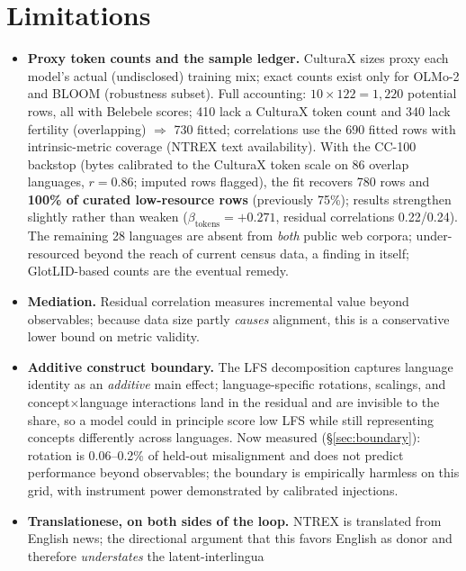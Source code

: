 \documentclass[11pt,a4paper]{article}
\begin{document}
\section{Limitations}
\begin{itemize}
  \item \textbf{Proxy token counts and the sample ledger.} CulturaX sizes
  proxy each model's actual (undisclosed) training mix; exact counts exist
  only for OLMo-2 and BLOOM (robustness subset). Full accounting: $10 \times
  122 = 1{,}220$ potential rows, all with Belebele scores; 410 lack a CulturaX
  token count and 340 lack fertility (overlapping) $\Rightarrow$ 730 fitted;
  correlations use the 690 fitted rows with intrinsic-metric coverage
  (NTREX text availability). With the CC-100 backstop (bytes calibrated to
  the CulturaX token scale on 86 overlap languages, $r{=}0.86$; imputed rows
  flagged), the fit recovers 780 rows and \textbf{100\% of curated
  low-resource rows} (previously 75\%); results strengthen slightly rather
  than weaken ($\beta_{\mathrm{tokens}} = +0.271$, residual correlations
  0.22/0.24). The remaining 28 languages are absent from \emph{both} public
  web corpora; under-resourced beyond the reach of current census data, a
  finding in itself; GlotLID-based counts are the eventual remedy.
  \item \textbf{Mediation.} Residual correlation measures incremental value
  beyond observables; because data size partly \emph{causes} alignment, this
  is a conservative lower bound on metric validity.
  \item \textbf{Additive construct boundary.} The LFS decomposition captures
  language identity as an \emph{additive} main effect; language-specific
  rotations, scalings, and concept$\times$language interactions land in the
  residual and are invisible to the share, so a model could in principle
  score low LFS while still representing concepts differently across
  languages. Now measured (\S\ref{sec:boundary}): rotation is 0.06--0.2\%
  of held-out misalignment and does not predict performance beyond
  observables; the boundary is empirically harmless on this grid, with
  instrument power demonstrated by calibrated injections.
  \item \textbf{Translationese, on both sides of the loop.} NTREX is
  translated from English news; the directional argument that this favors
  English as donor and therefore \emph{understates} the latent-interlingua

\end{itemize}
\end{document}
